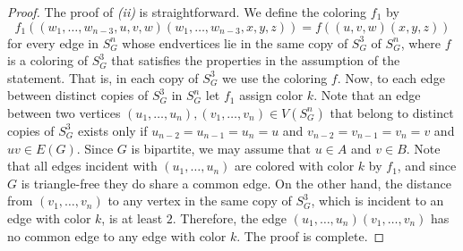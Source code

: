 \documentclass[10pt,a4paper]{amsart}
\begin{document}
\begin{proof}
The proof of {\it (ii)} is straightforward. We define the coloring $f_1$ by 
$$f_1((w_1,\ldots,w_{n-3},u,v,w)(w_1,\ldots,w_{n-3},x,y,z))=f((u,v,w)(x,y,z))$$ for every edge in $S_G^n$ whose endvertices lie in the same copy of $S_G^3$ of $S_G^n$, where $f$ is a coloring of $S_G^3$ that satisfies the properties in the assumption of the statement. That is, in each copy of $S_G^3$ we use the coloring $f$. Now, to each edge between distinct copies of $S_G^3$ in $S_G^n$ let $f_1$ assign color $k$. Note that an edge between two vertices $(u_1,\ldots, u_n),(v_1,\ldots,v_n)\in V(S_G^n)$ that belong to distinct copies of $S_G^3$ exists only if $u_{n-2}=u_{n-1}=u_{n}=u$ and $v_{n-2}=v_{n-1}=v_{n}=v$ and $uv\in E(G)$. Since $G$ is bipartite, we may assume that $u\in A$ and $v\in B$. Note that all edges incident with $(u_1,\ldots, u_n)$ are colored with color $k$ by $f_1$, and since $G$ is triangle-free they do share a common edge. On the other hand, the distance from $(v_1,\ldots,v_n)$ to any vertex in the same copy of $S_G^3$, which is incident to an edge with color $k$, is at least $2$. Therefore, the edge $(u_1,\ldots, u_n)(v_1,\ldots,v_n)$ has no common edge to any edge with color $k$. 
The proof is complete.  
\end{proof}	
\end{document}
